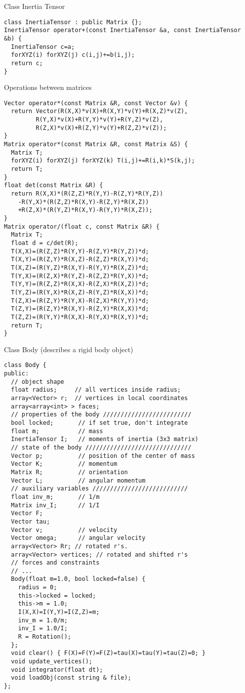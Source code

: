 Class Inertia Tensor
\begin{lstlisting}
class InertiaTensor : public Matrix {};
InertiaTensor operator+(const InertiaTensor &a, const InertiaTensor &b) {
  InertiaTensor c=a;
  forXYZ(i) forXYZ(j) c(i,j)+=b(i,j);
  return c;
}
\end{lstlisting}

Operations between matrices
\begin{lstlisting}
Vector operator*(const Matrix &R, const Vector &v) {
  return Vector(R(X,X)*v(X)+R(X,Y)*v(Y)+R(X,Z)*v(Z),
		 R(Y,X)*v(X)+R(Y,Y)*v(Y)+R(Y,Z)*v(Z),
		 R(Z,X)*v(X)+R(Z,Y)*v(Y)+R(Z,Z)*v(Z));
}
Matrix operator*(const Matrix &R, const Matrix &S) {
  Matrix T;
  forXYZ(i) forXYZ(j) forXYZ(k) T(i,j)+=R(i,k)*S(k,j);
  return T;
}
float det(const Matrix &R) {
  return R(X,X)*(R(Z,Z)*R(Y,Y)-R(Z,Y)*R(Y,Z))
    -R(Y,X)*(R(Z,Z)*R(X,Y)-R(Z,Y)*R(X,Z))
    +R(Z,X)*(R(Y,Z)*R(X,Y)-R(Y,Y)*R(X,Z));
}
Matrix operator/(float c, const Matrix &R) {
  Matrix T;
  float d = c/det(R);
  T(X,X)=(R(Z,Z)*R(Y,Y)-R(Z,Y)*R(Y,Z))*d;
  T(X,Y)=(R(Z,Y)*R(X,Z)-R(Z,Z)*R(X,Y))*d;
  T(X,Z)=(R(Y,Z)*R(X,Y)-R(Y,Y)*R(X,Z))*d;
  T(Y,X)=(R(Z,X)*R(Y,Z)-R(Z,Z)*R(Y,X))*d;
  T(Y,Y)=(R(Z,Z)*R(X,X)-R(Z,X)*R(X,Z))*d;
  T(Y,Z)=(R(Y,X)*R(X,Z)-R(Y,Z)*R(X,X))*d;
  T(Z,X)=(R(Z,Y)*R(Y,X)-R(Z,X)*R(Y,Y))*d;
  T(Z,Y)=(R(Z,Y)*R(X,Y)-R(Z,Y)*R(X,X))*d;
  T(Z,Z)=(R(Y,Y)*R(X,X)-R(Y,X)*R(X,Y))*d;
  return T;
}
\end{lstlisting}

Class Body (describes a rigid body object)
\begin{lstlisting}
class Body {
public:
  // object shape
  float radius;     // all vertices inside radius;
  array<Vector> r;  // vertices in local coordinates
  array<array<int> > faces;
  // properties of the body /////////////////////////
  bool locked;       // if set true, don't integrate
  float m;           // mass
  InertiaTensor I;   // moments of inertia (3x3 matrix)
  // state of the body //////////////////////////////
  Vector p;          // position of the center of mass
  Vector K;          // momentum
  Matrix R;          // orientation
  Vector L;          // angular momentum
  // auxiliary variables ///////////////////////////
  float inv_m;       // 1/m
  Matrix inv_I;      // 1/I
  Vector F;
  Vector tau;
  Vector v;          // velocity
  Vector omega;      // angular velocity
  array<Vector> Rr; // rotated r's.
  array<Vector> vertices; // rotated and shifted r's
  // forces and constraints
  // ...
  Body(float m=1.0, bool locked=false) {
    radius = 0;
    this->locked = locked;
    this->m = 1.0;
    I(X,X)=I(Y,Y)=I(Z,Z)=m;
    inv_m = 1.0/m;
    inv_I = 1.0/I;
    R = Rotation();
  };
  void clear() { F(X)=F(Y)=F(Z)=tau(X)=tau(Y)=tau(Z)=0; }
  void update_vertices();
  void integrator(float dt);
  void loadObj(const string & file);
};
\end{lstlisting}

